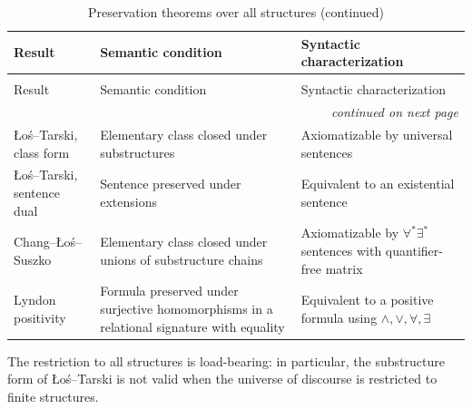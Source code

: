 \begingroup\small
\begin{longtable}{@{}p{}p{}p{}@{}}
\caption{Preservation theorems over all structures.}
\label{tab:p03-preservation}\\
\toprule
Result & Semantic condition & Syntactic characterization \\
\midrule
\endfirsthead
\caption[]{Preservation theorems over all structures (continued)}\\
\toprule
Result & Semantic condition & Syntactic characterization \\
\midrule
\endhead
\midrule\multicolumn{3}{r}{\emph{continued on next page}}\\
\endfoot
\endlastfoot
{\raggedright \L o\'s--Tarski, class form\par} &
  {\raggedright Elementary class closed under substructures\par} &
  {\raggedright Axiomatizable by universal sentences\par} \\
\addlinespace
{\raggedright \L o\'s--Tarski, sentence dual\par} &
  {\raggedright Sentence preserved under extensions\par} &
  {\raggedright Equivalent to an existential sentence\par} \\
\addlinespace
{\raggedright Chang--\L o\'s--Suszko\par} &
  {\raggedright Elementary class closed under unions of substructure chains\par} &
  {\raggedright Axiomatizable by \(\forall^{*}\exists^{*}\) sentences with
  quantifier-free matrix\par} \\
\addlinespace
{\raggedright Lyndon positivity\par} &
  {\raggedright Formula preserved under surjective homomorphisms in a
  relational signature with equality\par} &
  {\raggedright Equivalent to a positive formula using
  \(\land,\lor,\forall,\exists\)\par} \\
\bottomrule
\end{longtable}
\endgroup

The restriction to all structures is load-bearing: in particular, the
substructure form of \L o\'s--Tarski is not valid when the universe of discourse
is restricted to finite structures.

